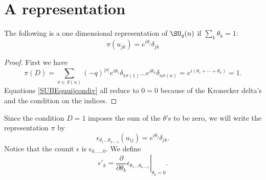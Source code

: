 \section{A representation}

\begin{proposition}     \label{PropReprezThetasuqn}
    The following is a one dimensional representation of $\SU_q(n)$ if $\sum_k\theta_k=1$:
    \begin{equation}
        \pi(u_{jk})= e^{i\theta_j}\delta_{jk}
    \end{equation}
\end{proposition}

\begin{proof}
    First we have
    \begin{equation}
        \pi(D)=\sum_{\sigma\in S(n)}(-q)^{| \sigma |} e^{i\theta_1}\delta_{1\sigma(1)}\ldots e^{i\theta_n}\delta_{n\sigma(n)}= e^{i(\theta_1+\cdots+\theta_n)}=1.
    \end{equation}
    Equations \eqref{SUBEquuijcondiv} all reduce to $0=0$ because of the Kronecker delta's and the condition on the indices.
\end{proof}

Since the condition $D=1$ imposes the sum of the $\theta$'s to be zero, we will write the representation $\pi$ by
\begin{equation}
    \epsilon_{\theta_1\ldots\theta_{n-1}}(u_{ij})= e^{i\theta_j}\delta_{jk}.
\end{equation}
Notice that the counit $\epsilon$ is $\epsilon_{0,\ldots,0}$. We define
\begin{equation}
    \epsilon'_k=\left.\frac{ \partial  }{ \partial \theta_k }\epsilon_{\theta_1\ldots\theta_{n-1}}\right|_{\theta_k=0}.
\end{equation}


